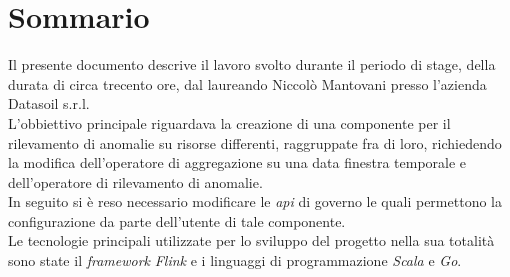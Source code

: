 
\cleardoublepage
{}
{}
\begingroup
\let\clearpage\relax
\let\cleardoublepage\relax
\let\cleardoublepage\relax

\chapter*{Sommario}

Il presente documento descrive il lavoro svolto durante il periodo di stage, della durata di circa trecento ore, dal laureando Niccolò Mantovani presso l'azienda Datasoil s.r.l.\\
L'obbiettivo principale riguardava la creazione di una componente per il rilevamento di anomalie su risorse differenti, raggruppate fra di loro, richiedendo la modifica dell'operatore di aggregazione su una data finestra temporale e dell'operatore di rilevamento di anomalie.\\
In seguito si è reso necessario modificare le \textit{\gls{api}} di governo le quali permettono la configurazione da parte dell'utente di tale componente.\\
Le tecnologie principali utilizzate per lo sviluppo del progetto nella sua totalità sono state il \textit{\textit{\gls{framework}}} \textit{Flink} e i linguaggi di programmazione \textit{Scala} e \textit{Go}.

%
%

\endgroup			

\vfill


